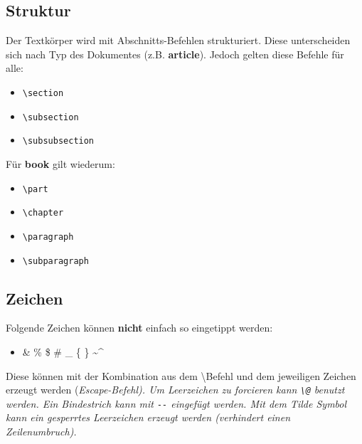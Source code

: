 \documentclass[10pt]{article}  %
\begin{document}
    \subsection{Struktur}
        Der Textkörper wird mit Abschnitts-Befehlen strukturiert. Diese unterscheiden sich nach Typ des Dokumentes (z.B. \textbf{article}). Jedoch gelten diese Befehle für alle:
        \begin{itemize}
            \item \verb!\section!
            \item \verb!\subsection!
            \item \verb!\subsubsection!
        \end{itemize}
        Für \textbf{book} gilt wiederum:
        \begin{itemize}
            \item \verb!\part!
            \item \verb!\chapter!
            \item \verb!\paragraph!
            \item \verb!\subparagraph!
        \end{itemize}
    \subsection{Zeichen}
        Folgende Zeichen können \textbf{nicht} einfach so eingetippt werden:
        \begin{itemize}
            \item \& \@ \% \@ \$ \@ \# \@ \_ \@ \{ \@ \} \@ \~ \@ \^ \@
        \end{itemize}
        Diese können mit der Kombination aus dem \textbackslash \@ Befehl und dem jeweiligen Zeichen erzeugt werden (\em Escape-Befehl\normalfont).  %
        Um Leerzeichen zu forcieren kann \verb!\@! benutzt werden. Ein Bindestrich kann mit \verb!--! eingefügt werden. Mit dem Tilde Symbol kann ein gesperrtes Leerzeichen erzeugt werden (verhindert einen Zeilenumbruch).
\end{document}
